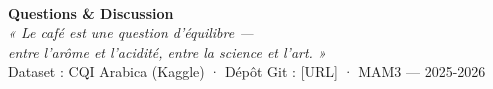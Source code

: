 \documentclass[aspectratio=169,12pt]{beamer}
\begin{document}
{
\begin{frame}[plain]
  \begin{center}
    \vspace{1.5cm}
    {\Huge\bfseries\textcolor{coffeegold}{\faQuestion}}\\[0.5cm]
    {\Large\bfseries\textcolor{coffeecream}{Questions \& Discussion}}\\[1cm]
    {\normalsize\textcolor{coffeecream!80}{
      \textit{« Le café est une question d'équilibre —}\\
      \textit{entre l'arôme et l'acidité, entre la science et l'art. »}}}\\[1.5cm]
    {\small\textcolor{coffeecream!60}{
      Dataset : CQI Arabica (Kaggle) · Dépôt Git : [URL] · MAM3 — 2025-2026}}
  \end{center}
\end{frame}
}
\end{document}
